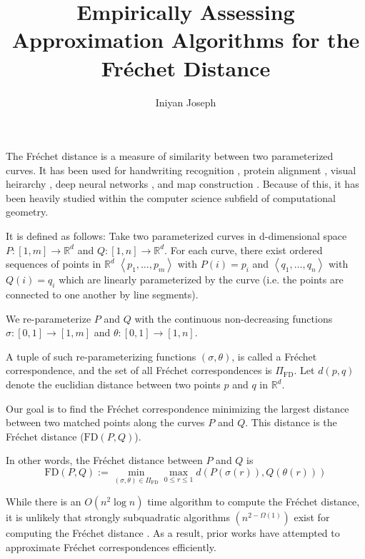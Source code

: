 \documentclass{article}
\title{Empirically Assessing Approximation Algorithms for the Fr{\'e}chet Distance}
\author{Iniyan Joseph}
\date{}
\begin{document}
\maketitle

The Fr{\'e}chet distance is a measure of similarity between two parameterized curves. It has been used for handwriting recognition \cite{handwriting}, protein alignment \cite{ProteinStructureAlignment}, visual heirarchy \cite{visualheirarchy}, deep neural networks \cite{deepneuralnetwork}, and map construction \cite{mapconstruction, mapMatching}. Because of this, it has been heavily studied within the computer science subfield of computational geometry.

It is defined as follows: Take two parameterized curves in d-dimensional space $P : [1, m] \to \mathbb{R}^d$ and $Q : [1, n] \to \mathbb{R}^d$. For each curve, there exist ordered sequences of points in $\mathbb{R}^d$ $\left<p_1,\dots,p_m\right>$ with $P(i) = p_i$ and $\left<q_1,\dots,q_n\right>$ with $Q(i) = q_i$ which are linearly parameterized by the curve (i.e. the points are connected to one another by line segments).

We re-parameterize $P$ and $Q$ with the continuous non-decreasing functions $\sigma : \left[0, 1\right] \to \left[1, m\right]$ and $\theta : \left[0, 1\right] \to \left[1, n\right]$. %

A tuple of such re-parameterizing functions $(\sigma, \theta)$, is called a Fr{\'e}chet correspondence, and the set of all Fr{\'e}chet correspondences is $\Pi_{\text{FD}}$.
Let $d \left(p, q\right)$ denote the euclidian distance between two points $p$ and $q$ in $\mathbb{R}^d$.

Our goal is to find the Fr{\'e}chet correspondence minimizing the largest distance between two matched points along the curves $P$ and $Q$. This distance is the Fr{\'e}chet distance ($\text{FD}(P, Q)$).

In other words, the Fr{\'e}chet distance between $P$ and $Q$ is
\[ \text{FD}(P, Q) := \min_{(\sigma, \theta) \in \Pi_{\text{FD}}} \max_{0\leq r \leq 1} d (P(\sigma(r)), Q(\theta (r)))\]


While there is an $O(n^2 \log n)$ time algorithm to compute the Fr{\'e}chet distance, it is unlikely that strongly subquadratic algorithms $(n^{2-\Omega(1)})$ exist for computing the Fr{\'e}chet distance \cite{whywalkingthedogtakestime}. As a result, prior works have attempted to approximate Fr{\'e}chet correspondences efficiently.
\end{document}
